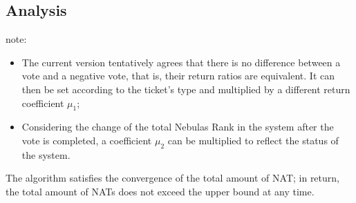 \subsection{Analysis}

note:
\begin{itemize}
\item The current version tentatively agrees that there is no difference between a vote and a negative vote, that is, their return ratios are equivalent. It can then be set according to the ticket's type and multiplied by a different return coefficient $\mu_1$;
\item Considering the change of the total Nebulas Rank in the system after the vote is completed, a coefficient $\mu_2$ can be multiplied to reflect the status of the system.
\end{itemize}

\begin{property}
	The algorithm satisfies the convergence of the total amount of NAT; in return, the total amount of NATs does not exceed the upper bound at any time.
\end{property}

